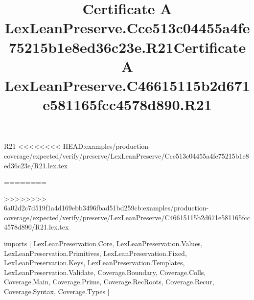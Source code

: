 \begin{lexlean}{R21}
<<<<<<<< HEAD:examples/production-coverage/expected/verify/preserve/LexLeanPreserve/Cce513c04455a4fe75215b1e8ed36c23e/R21.lex.tex
\title{Certificate A LexLeanPreserve.Cce513c04455a4fe75215b1e8ed36c23e.R21}
========
\title{Certificate A LexLeanPreserve.C46615115b2d671e581165fcc4578d890.R21}
>>>>>>>> 6a02d2c7d519f1a4d169ebb3496fbad51bd259cb:examples/production-coverage/expected/verify/preserve/LexLeanPreserve/C46615115b2d671e581165fcc4578d890/R21.lex.tex
\begin{coremodule}
imports [
  LexLeanPreservation.Core,
  LexLeanPreservation.Values,
  LexLeanPreservation.Primitives,
  LexLeanPreservation.Fixed,
  LexLeanPreservation.Keys,
  LexLeanPreservation.Templates,
  LexLeanPreservation.Validate,
  Coverage.Boundary,
  Coverage.Colls,
  Coverage.Main,
  Coverage.Prims,
  Coverage.RecRoots,
  Coverage.Recur,
  Coverage.Syntax,
  Coverage.Types
]


\end{coremodule}
\end{lexlean}
